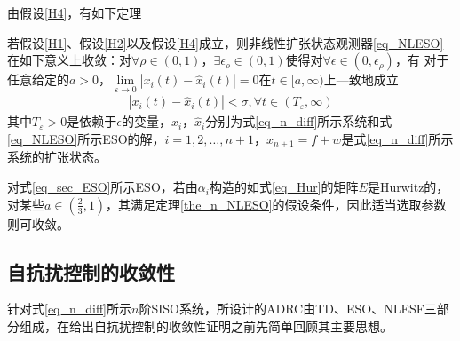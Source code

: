 由假设\ref{H4}，有如下定理\cite{Guo_2011}
\begin{theorem}
	若假设\ref{H1}、假设\ref{H2}以及假设\ref{H4}成立，则非线性扩张状态观测器\eqref{eq_NLESO}在如下意义上收敛：对$ \forall \rho \in (0,1) $，$ \exists \epsilon_\rho \in (0,1)$使得对$ \forall  \epsilon \in (0,\epsilon_\rho)$，有
	对于任意给定的$ a>0 $，$ \lim\limits_{\varepsilon \rightarrow 0}\left|x_{i}(t)-\hat{x}_{i}(t)\right|=0 $在$t \in [a, \infty)$上—致地成立
	\begin{align*}\left|x_{i}(t)-\hat{x}_{i}(t)\right|<\sigma, \forall t \in\left(T_{\varepsilon}, \infty\right)\end{align*}
	其中$ T_{\varepsilon} >0 $是依赖于$\epsilon $的变量，$x_{i}$，$ \hat{x}_{i}$分别为式\eqref{eq_n_diff}所示系统和式\eqref{eq_NLESO}所示ESO的解，$i=1,2, \ldots, n+1$，$ x_{n+1}=f+w$是式\eqref{eq_n_diff}所示系统的扩张状态。	\label{the_n_NLESO}
\end{theorem}

对式\eqref{eq_sec_ESO}所示ESO，若由$ \alpha_i $构造的如式\eqref{eq_Hur}的矩阵$ E $是Hurwitz的，对某些$ a \in \left( \frac{2}{3} , 1\right)  $，其满足定理\ref{the_n_NLESO}的假设条件，因此适当选取参数则可收敛。
\subsection{自抗扰控制的收敛性}
针对式\eqref{eq_n_diff}所示$ n $阶SISO系统，所设计的ADRC由TD、ESO、NLESF三部分组成，在给出自抗扰控制的收敛性证明之前先简单回顾其主要思想。


